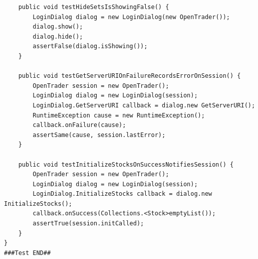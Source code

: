 \begin{lstlisting}
    public void testHideSetsIsShowingFalse() {
        LoginDialog dialog = new LoginDialog(new OpenTrader());
        dialog.show();
        dialog.hide();
        assertFalse(dialog.isShowing());
    }

    public void testGetServerURIOnFailureRecordsErrorOnSession() {
        OpenTrader session = new OpenTrader();
        LoginDialog dialog = new LoginDialog(session);
        LoginDialog.GetServerURI callback = dialog.new GetServerURI();
        RuntimeException cause = new RuntimeException();
        callback.onFailure(cause);
        assertSame(cause, session.lastError);
    }

    public void testInitializeStocksOnSuccessNotifiesSession() {
        OpenTrader session = new OpenTrader();
        LoginDialog dialog = new LoginDialog(session);
        LoginDialog.InitializeStocks callback = dialog.new InitializeStocks();
        callback.onSuccess(Collections.<Stock>emptyList());
        assertTrue(session.initCalled);
    }
}
###Test END##
\end{lstlisting}

